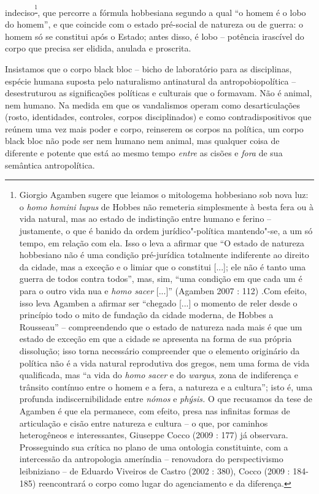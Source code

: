 indeciso\textsuperscript{\footnote{Giorgio Agamben sugere que leiamos o
  mitologema hobbesiano sob nova luz: o \emph{homo homini lupus} de
  Hobbes não remeteria simplesmente à besta fera ou à vida natural, mas
  ao estado de indistinção entre humano e ferino -- justamente, o que é
  banido da ordem jurídico"-política mantendo"-se, a um só tempo, em
  relação com ela. Isso o leva a afirmar que ``O estado de natureza
  hobbesiano não é uma condição pré-jurídica totalmente indiferente ao
  direito da cidade, mas a exceção e o limiar que o constitui {[}...{]};
  ele não é tanto uma guerra de todos contra todos'', mas, sim, ``uma
  condição em que cada um é para o outro vida nua e \emph{homo sacer
  }{[}...{]}'' (Agamben 2007 : 112) .Com efeito, isso leva Agamben a
  afirmar ser ``chegado {[}...{]} o momento de reler desde o princípio
  todo o mito de fundação da cidade moderna, de Hobbes a Rousseau'' --
  compreendendo que o estado de natureza nada mais é que um estado de
  exceção em que a cidade se apresenta na forma de sua própria
  dissolução; isso torna necessário compreender que o elemento
  originário da política não é a vida natural reprodutiva dos gregos,
  nem uma forma de vida qualificada, mas ``a vida do \emph{homo sacer} e
  do \emph{wargus}, zona de indiferença e trânsito contínuo entre o
  homem e a fera, a natureza e a cultura''; isto é, uma profunda
  indiscernibilidade entre \emph{nómos }e \emph{phýsis. }O que recusamos
  da tese de Agamben é que ela permanece, com efeito, presa nas
  infinitas formas de articulação e cisão entre natureza e cultura -- o
  que, por caminhos heterogêneos e interessantes, Giuseppe Cocco (2009 :
  177) já observara. Prosseguindo sua crítica no plano de uma ontologia
  constituinte, com a intercessão da antropologia ameríndia --
  renovadora do perspectivismo leibniziano -- de Eduardo Viveiros de
  Castro (2002 : 380), Cocco (2009 : 184-185) reencontrará o corpo como
  lugar do agenciamento e da diferença. }}, que percorre a fórmula
hobbesiana segundo a qual ``o homem é o lobo do homem'', e que coincide
com o estado pré-social de natureza ou de guerra: o homem só se
constitui após o Estado; antes disso, é lobo -- potência irascível do
corpo que precisa ser elidida, anulada e proscrita.

Insistamos que o corpo black bloc -- bicho de laboratório para as
disciplinas, espécie humana suposta pelo naturalismo antinatural da
antropobiopolítica -- desestruturou as significações políticas e
culturais que o formavam. Não é animal, nem humano. Na medida em que os
vandalismos operam como desarticulações (rosto, identidades, controles,
corpos disciplinados) e como contradispositivos que reúnem uma vez mais
poder e corpo, reinserem os corpos na política, um corpo black bloc não
pode ser nem humano nem animal, mas qualquer coisa de diferente e
potente que está ao mesmo tempo \emph{entre }as cisões e
\emph{fora }de sua semântica antropolítica.

